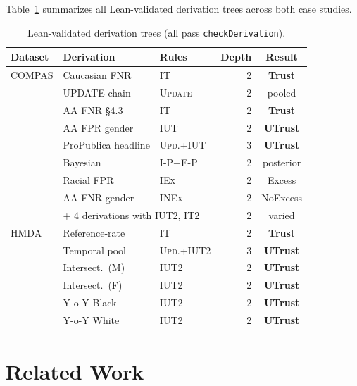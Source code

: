 \documentclass{ceurart}
\newcommand{\smark}[1]{\textsc{#1}}
\newcommand{\Trust}{\textbf{Trust}}
\newcommand{\UTrust}{\textbf{UTrust}}
\begin{document}
Table~\ref{tab:test-summary} summarizes all Lean-validated
derivation trees across both case studies.

\begin{table}[t]
\small\centering
\begin{tabular}{@{}lllrc@{}}
\toprule
Dataset & Derivation & Rules & Depth & Result \\
\midrule
COMPAS & Caucasian FNR & \smark{IT} & 2 & \Trust \\
       & UPDATE chain & \smark{Update} & 2 & pooled \\
       & AA FNR \S4.3 & \smark{IT} & 2 & \Trust \\
       & AA FPR gender & \smark{IUT} & 2 & \UTrust \\
       & ProPublica headline & \smark{Upd.+IUT} & 3 & \UTrust \\
       & Bayesian & \smark{I-P+E-P} & 2 & posterior \\
       & Racial FPR & \smark{IEx} & 2 & Excess \\
       & AA FNR gender & \smark{INEx} & 2 & NoExcess \\
       & \multicolumn{2}{l}{+ 4 derivations with \smark{IUT2, IT2}} & 2 & varied \\
\midrule
HMDA   & Reference-rate & \smark{IT} & 2 & \Trust \\
       & Temporal pool & \smark{Upd.+IUT2} & 3 & \UTrust \\
       & Intersect.\ (M) & \smark{IUT2} & 2 & \UTrust \\
       & Intersect.\ (F) & \smark{IUT2} & 2 & \UTrust \\
       & Y-o-Y Black & \smark{IUT2} & 2 & \UTrust \\
       & Y-o-Y White & \smark{IUT2} & 2 & \UTrust \\
\bottomrule
\end{tabular}
\caption{Lean-validated derivation trees (all pass
  \texttt{checkDerivation}).}
\label{tab:test-summary}
\end{table}


\section{Related Work}\label{sec:related}
\end{document}
